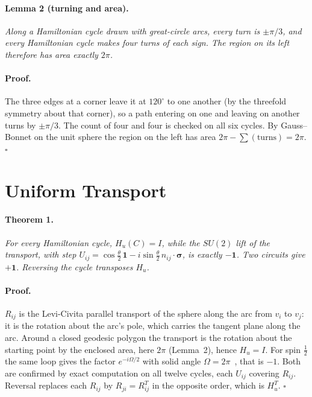 \documentclass[twocolumn]{iopjournal}
\begin{document}
\paragraph{Lemma 2 (turning and area).} \textit{Along a Hamiltonian
cycle drawn with great-circle arcs, every turn is $\pm\pi/3$, and
every Hamiltonian cycle makes four turns of each sign. The region on
its left therefore has area exactly $2\pi$.}

\paragraph{Proof.} The three edges at a corner leave it at
$120^\circ$ to one another (by the threefold symmetry about that
corner), so a path entering on one and leaving on another turns by
$\pm\pi/3$. The count of four and four is checked on all six cycles.
By Gauss--Bonnet on the unit sphere the region on the left has area
$2\pi - \sum(\text{turns}) = 2\pi$. \hfill $\square$


\section*{Uniform Transport}

\paragraph{Theorem 1.} \textit{For every Hamiltonian cycle,
$H_u(C) = I$, while the $SU(2)$ lift of the transport, with step
$U_{ij} = \cos\tfrac\theta2\,\mathbf 1 - i\sin\tfrac\theta2\,
n_{ij}\cdot\boldsymbol\sigma$, is exactly $-\mathbf 1$. Two circuits
give $+\mathbf 1$. Reversing the cycle transposes $H_u$.}

\paragraph{Proof.} $R_{ij}$ is the Levi-Civita parallel transport of
the sphere along the arc from $v_i$ to $v_j$: it is the rotation about
the arc's pole, which carries the tangent plane along the arc. Around
a closed geodesic polygon the transport is the rotation about the
starting point by the enclosed area, here $2\pi$ (Lemma~2), hence
$H_u = I$. For spin $\tfrac12$ the same loop gives the factor
$e^{-i\Omega/2}$ with solid angle $\Omega = 2\pi$~\cite{Berry}, that is
$-1$. Both are confirmed by exact computation on all twelve cycles,
each $U_{ij}$ covering $R_{ij}$. Reversal replaces each $R_{ij}$ by
$R_{ji} = R_{ij}^T$ in the opposite order, which is $H_u^T$.
\hfill $\square$
\end{document}
